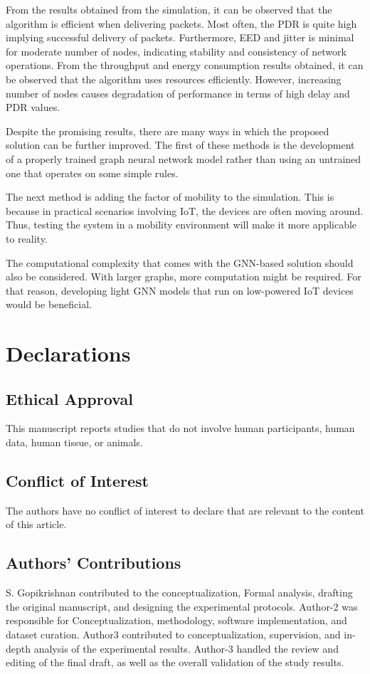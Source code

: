 \documentclass[a4paper,fleqn]{cas-dc}
\numberwithin{equation}{section}
\begin{document}
From the results obtained from the simulation, it can be observed that the algorithm is efficient when delivering packets. Most often, the PDR is quite high implying successful delivery of packets. Furthermore, EED and jitter is minimal for moderate number of nodes, indicating stability and consistency of network operations. From the throughput and energy consumption results obtained, it can be observed that the algorithm uses resources efficiently. However, increasing number of nodes causes degradation of performance in terms of high delay and PDR values.

Despite the promising results, there are many ways in which the proposed solution can be further improved. The first of these methods is the development of a properly trained graph neural network model rather than using an untrained one that operates on some simple rules.

The next method is adding the factor of mobility to the simulation. This is because in practical scenarios involving IoT, the devices are often moving around. Thus, testing the system in a mobility environment will make it more applicable to reality.

The computational complexity that comes with the GNN-based solution should also be considered. With larger graphs, more computation might be required. For that reason, developing light GNN models that run on low-powered IoT devices would be beneficial.





\section*{Declarations}
\subsection*{Ethical Approval}
This manuscript reports studies that do not involve human participants, human data, human tissue, or animals.

\subsection*{Conflict of Interest}
The authors have no conflict of interest to declare that are relevant to the content of this article.

\subsection*{Authors' Contributions}
S. Gopikrishnan contributed to the conceptualization, Formal analysis, drafting the original manuscript, and designing the experimental protocols. Author-2 was responsible for Conceptualization, methodology, software implementation, and dataset curation. Author3 contributed to conceptualization, supervision, and in-depth analysis of the experimental results. Author-3 handled the review and editing of the final draft, as well as the overall validation of the study results.
\end{document}
